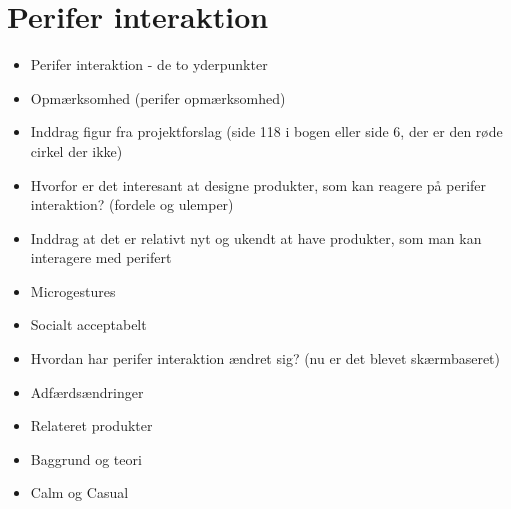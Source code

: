 \chapter{Perifer interaktion}
\label{PeriferInteratkion}
%
\begin{itemize}
  \item Perifer interaktion - de to yderpunkter
  \item Opmærksomhed (perifer opmærksomhed)
  \item Inddrag figur fra projektforslag (side 118 i bogen eller side 6, der er den røde cirkel der ikke)
  \item Hvorfor er det interesant at designe produkter, som kan reagere på perifer interaktion? (fordele og ulemper) 
  \item Inddrag at det er relativt nyt og ukendt at have produkter, som man kan interagere med perifert 
  \item Microgestures 
  \item Socialt acceptabelt 
  \item Hvordan har perifer interaktion ændret sig? (nu er det blevet skærmbaseret)
  \item Adfærdsændringer
  \item Relateret produkter  
  \item Baggrund og teori
  \item Calm og Casual
\end{itemize}
%



